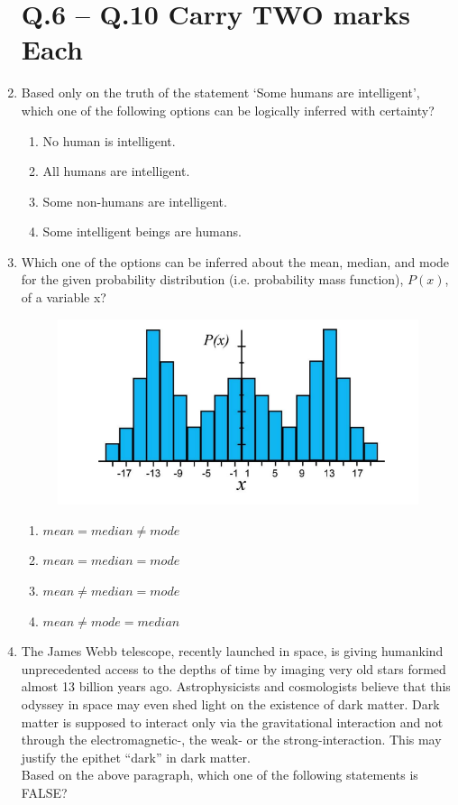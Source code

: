 \documentclass[journal,12pt,onecolumn]{IEEEtran}
\theoremstyle{remark}
\begin{document}
\begin{enumerate}
\section*{Q.6 – Q.10 Carry TWO marks Each}

\item Based only on the truth of the statement ‘Some humans are intelligent’, which one of the following options can be logically inferred with certainty?

\hfill{}
\begin{enumerate}
\item No human is intelligent.
\item All humans are intelligent. 
\item Some non-humans are intelligent.
\item Some intelligent beings are humans.
\end{enumerate}

\item Which one of the options can be inferred about the mean, median, and mode for the given probability distribution (i.e. probability mass function), $P(x)$, of a variable x?

\hfill{}
\begin{figure}[H]
\centering
\includegraphics[width=0.5\linewidth]{figs/q7.png}
\caption*{}
\label{fig:Q.7}
\end{figure}

\begin{enumerate}
\item $mean = median \neq mode$
\item $mean = median = mode$
\item $mean \neq median = mode$
\item $mean \neq mode = median$
\end{enumerate}

\item The James Webb telescope, recently launched in space, is giving humankind unprecedented access to the depths of time by imaging very old stars formed almost 13 billion years ago. Astrophysicists and cosmologists believe that this odyssey in space may even shed light on the existence of dark matter. Dark matter is supposed to interact only via the gravitational interaction and not through the electromagnetic-, the weak- or the strong-interaction. This may justify the epithet “dark” in dark matter.\\
Based on the above paragraph, which one of the following statements is FALSE?


\end{enumerate}
\end{document}

